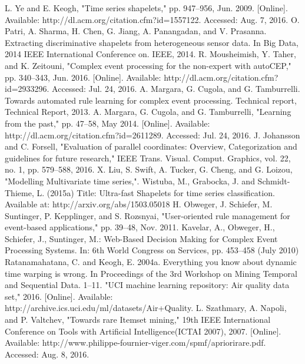 \documentclass[letterpaper, 10 pt, conference]{IEEEtran}  %
\begin{document}
\begin{thebibliography}{99}
 L. Ye and E. Keogh, "Time series shapelets," pp. 947–956, Jun. 2009. [Online]. Available: http://dl.acm.org/citation.cfm?id=1557122. Accessed: Aug. 7, 2016.
 O. Patri, A. Sharma, H. Chen, G. Jiang, A. Panangadan, and V. Prasanna. Extracting discriminative shapelets from heterogeneous sensor data. In Big Data, 2014 IEEE International Conference on. IEEE, 2014.
 R. Mousheimish, Y. Taher, and K. Zeitouni, "Complex event processing for the non-expert with autoCEP," pp. 340–343, Jun. 2016. [Online]. Available: http://dl.acm.org/citation.cfm?id=2933296. Accessed: Jul. 24, 2016.
 A. Margara, G. Cugola, and G. Tamburrelli. Towards automated rule learning for complex event processing. Technical report, Technical Report, 2013.
 A. Margara, G. Cugola, and G. Tamburrelli, "Learning from the past," pp. 47–58, May 2014. [Online]. Available: http://dl.acm.org/citation.cfm?id=2611289. Accessed: Jul. 24, 2016.
 J. Johansson and C. Forsell, "Evaluation of parallel coordinates: Overview, Categorization and guidelines for future research," IEEE Trans. Visual. Comput. Graphics, vol. 22, no. 1, pp. 579–588, 2016.
 X. Liu, S. Swift, A. Tucker, G. Cheng, and G. Loizou, "Modelling Multivariate time series,". 
 Wistuba, M., Grabocka, J. and Schmidt-Thieme, L. (2015a) Title: Ultra-fast Shapelets for time series classification. Available at: http://arxiv.org/abs/1503.05018
 H. Obweger, J. Schiefer, M. Suntinger, P. Kepplinger, and S. Rozsnyai, "User-oriented rule management for event-based applications," pp. 39–48, Nov. 2011. 
 Kavelar, A., Obweger, H., Schiefer, J., Suntinger, M.: Web-Based Decision Making for Complex Event Processing Systems. In: 6th World Congress on Services, pp. 453–458 (July 2010)
 Ratanamahatana, C. and Keogh, E. 2004a. Everything you know about dynamic time warping is wrong. In Proceedings of the 3rd Workshop on Mining Temporal and Sequential Data. 1--11.
 "UCI machine learning repository: Air quality data set," 2016. [Online]. Available: http://archive.ics.uci.edu/ml/datasets/Air+Quality.
 L. Szathmary, A. Napoli, and P. Valtchev, "Towards rare Itemset mining," 19th IEEE International Conference on Tools with Artificial Intelligence(ICTAI 2007), 2007. [Online]. Available: http://www.philippe-fournier-viger.com/spmf/apriorirare.pdf. Accessed: Aug. 8, 2016.


\end{thebibliography}
\end{document}
